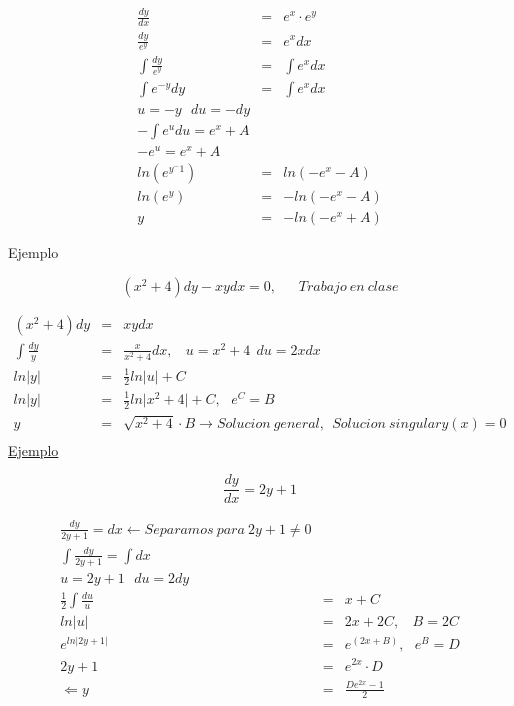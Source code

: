 \documentclass{article}
\begin{document}
\begin{eqnarray}
\nonumber \frac{dy}{dx} &=& e^x \cdot e^y \\
\nonumber \frac{dy}{e^y} &=& e^x dx \\
\nonumber \int \frac{dy}{e^y} &=& \int e^x dx \\
\nonumber \int e^{-y} dy &=& \int e^x dx \\
\nonumber u = -y \ \ \ du = -dy & & \\
\nonumber - \int e^u du = e^x + A \\
\nonumber -e^u = e^x + A \\
\nonumber ln \left(e^{y^-1} \right) &=& ln \left( -e^x - A \right) \\
\nonumber ln \left(e^{y} \right) &=& - ln \left( -e^x - A \right) \\
\nonumber y &=& -ln \left( -e^x + A \right)  
\end{eqnarray}

Ejemplo 

\begin{equation}
\left( x^2 + 4 \right) dy  - xydx  = 0, \ \ \ \ \ \ \ Trabajo \  en \ clase
\end{equation}

\begin{eqnarray}
\nonumber \left( x^2 + 4 \right) dy  &=& xydx \\
\nonumber \int \frac{dy}{y} &=& \frac{x}{x^2+4} dx, \ \ \ \  u = x^2 +4 \ \ du = 2xdx \\
\nonumber ln \lvert y \rvert &=& \frac{1}{2} ln \lvert u \rvert + C \\
\nonumber ln \lvert y \rvert &=& \frac{1}{2} ln \lvert x^2 + 4 \rvert  + C ,  \ \ \ e^C = B \\
\nonumber y &=& \sqrt{x^2 + 4} \cdot B \rightarrow Solucion \ general, \ \  Solucion \  singular y\left( x \right) = 0 \\ 
\end{eqnarray}
\underline{Ejemplo}

\begin{equation}
\frac{dy}{dx} = 2y +1 
\end{equation}

\begin{eqnarray}
\nonumber \frac{dy}{2y +1} = dx \leftarrow Separamos \ para \  2y +1 \neq 0 \\
\nonumber \int \frac{dy}{2y+1} = \int dx \\ 
\nonumber u = 2y+1 \ \ \ du =2dy & & \\
\nonumber \frac{1}{2} \int \frac{du}{u} &=& x + C \\
\nonumber ln \rvert u \lvert &=& 2x + 2C , \ \ \ \ B = 2C \\
\nonumber e^{ln \rvert 2y +1 \lvert} &=& e^{\left( 2x + B \right)}, \ \ \ e^B = D \\
\nonumber 2y + 1 &=& e^{2x} \cdot D \\
\nonumber \Leftarrow y &=& \frac{De^{2x}-1}{2}
\end{eqnarray}
\end{document}

